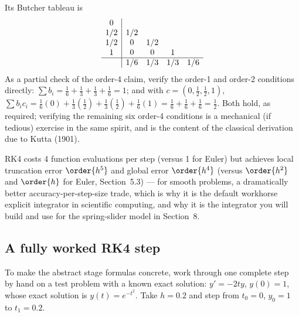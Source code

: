 Its Butcher tableau is
\begin{equation}
\begin{array}{c|cccc}
0 & & & & \\
1/2 & 1/2 & & & \\
1/2 & 0 & 1/2 & & \\
1 & 0 & 0 & 1 & \\ \hline
 & 1/6 & 1/3 & 1/3 & 1/6
\end{array}
\end{equation}
As a partial check of the order-4 claim, verify the order-1 and order-2 conditions directly: $\sum b_i = \tfrac16+\tfrac13+\tfrac13+\tfrac16 = 1$; and with $c = (0,\tfrac12,\tfrac12,1)$, $\sum b_i c_i = \tfrac16(0) + \tfrac13(\tfrac12)+\tfrac13(\tfrac12)+\tfrac16(1) = \tfrac16+\tfrac16+\tfrac16 = \tfrac12$. Both hold, as required; verifying the remaining six order-4 conditions is a mechanical (if tedious) exercise in the same spirit, and is the content of the classical derivation due to Kutta (1901).

RK4 costs 4 function evaluations per step (versus 1 for Euler) but achieves local truncation error $\order{h^5}$ and global error $\order{h^4}$ (versus $\order{h^2}$ and $\order{h}$ for Euler, Section~5.3) --- for smooth problems, a dramatically better accuracy-per-step-size trade, which is why it is the default workhorse explicit integrator in scientific computing, and why it is the integrator you will build and use for the spring-slider model in Section~8.

\subsection{A fully worked RK4 step}

To make the abstract stage formulas concrete, work through one complete step by hand on a test problem with a known exact solution: $y' = -2ty$, $y(0)=1$, whose exact solution is $y(t)=e^{-t^2}$. Take $h=0.2$ and step from $t_0=0$, $y_0=1$ to $t_1=0.2$.

